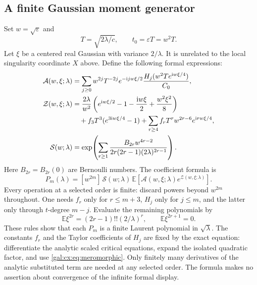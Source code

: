 \documentclass[11pt,letterpaper]{article}
\numberwithin{equation}{section}
\theoremstyle{definition}\newtheorem{definition}[theorem]{Definition}
\theoremstyle{remark}\newtheorem{remark}[theorem]{Remark}
\newcommand{\ii}{\mathrm i}
\newcommand{\eps}{\varepsilon}
\begin{document}
\subsection{A finite Gaussian moment generator}
Set $w=\sqrt\eps$ and
\begin{equation}\label{gal:cx:eq:T}
T=\sqrt{2\lambda/c},\qquad t_0=\eps T=w^2T.
\end{equation}
Let $\xi$ be a centered real Gaussian with variance $2/\lambda$. It is unrelated to the local singularity coordinate $X$ above. Define the following formal expressions:
\begin{align}
\mathcal A(w,\xi;\lambda)
&=\sum_{j\ge0}w^{2j}T^{-2j}e^{-\ii jw\xi/2}
\frac{H_j(w^2T e^{\ii w\xi/4})}{C_0},\label{gal:cx:eq:Agen}\\
\mathcal Z(w,\xi;\lambda)
&=\frac{2\lambda}{w^2}
\left(e^{\ii w\xi/2}-1-\frac{\ii w\xi}{2}
+\frac{w^2\xi^2}{8}\right)\notag\\
&\quad+f_3T^3(e^{3\ii w\xi/4}-1)
+\sum_{r\ge4}f_rT^rw^{2r-6}e^{\ii rw\xi/4},\label{gal:cx:eq:Zgen}\\
\mathcal S(w;\lambda)
&=\exp\!\left(\sum_{r\ge1}
\frac{B_{2r}w^{4r-2}}
{2r(2r-1)(2\lambda)^{2r-1}}\right).
\label{gal:cx:eq:Sgen}
\end{align}
Here $B_{2r}=B_{2r}(0)$ are Bernoulli numbers. The coefficient formula is
\begin{equation}\label{gal:cx:eq:Pgen}
P_m(\lambda)=[w^{2m}]\,
\mathcal S(w;\lambda)\,\mathbb E\!\left[
\mathcal A(w,\xi;\lambda)e^{\mathcal Z(w,\xi;\lambda)}\right].
\end{equation}
Every operation at a selected order is finite: discard powers beyond $w^{2m}$ throughout. One needs $f_r$ only for $r\le m+3$, $H_j$ only for $j\le m$, and the latter only through $t$-degree $m-j$. Evaluate the remaining polynomials by
\begin{equation}\label{gal:cx:eq:moments}
\mathbb E\xi^{2r}=(2r-1)!!(2/\lambda)^r,
\qquad \mathbb E\xi^{2r+1}=0.
\end{equation}
These rules show that each $P_m$ is a finite Laurent polynomial in $\sqrt\lambda$. The constants $f_r$ and the Taylor coefficients of $H_j$ are fixed by the exact equation: differentiate the analytic scaled critical equations, expand the isolated quadratic factor, and use \eqref{gal:cx:eq:meromorphic}. Only finitely many derivatives of the analytic substituted term are needed at any selected order. The formula makes no assertion about convergence of the infinite formal display.
\end{document}
